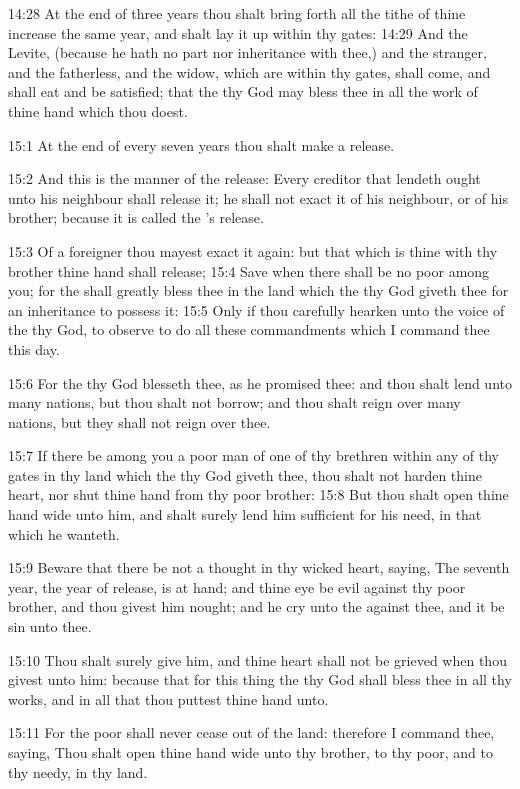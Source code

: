 14:28 At the end of three years thou shalt bring forth all the tithe of thine increase the same year, and shalt lay it up within thy gates: 14:29 And the Levite, (because he hath no part nor inheritance with thee,) and the stranger, and the fatherless, and the widow, which are within thy gates, shall come, and shall eat and be satisfied; that the \LORD thy God may bless thee in all the work of thine hand which thou doest.

15:1 At the end of every seven years thou shalt make a release.

15:2 And this is the manner of the release: Every creditor that lendeth ought unto his neighbour shall release it; he shall not exact it of his neighbour, or of his brother; because it is called the \LORD's release.

15:3 Of a foreigner thou mayest exact it again: but that which is thine with thy brother thine hand shall release; 15:4 Save when there shall be no poor among you; for the \LORD shall greatly bless thee in the land which the \LORD thy God giveth thee for an inheritance to possess it: 15:5 Only if thou carefully hearken unto the voice of the \LORD thy God, to observe to do all these commandments which I command thee this day.

15:6 For the \LORD thy God blesseth thee, as he promised thee: and thou shalt lend unto many nations, but thou shalt not borrow; and thou shalt reign over many nations, but they shall not reign over thee.

15:7 If there be among you a poor man of one of thy brethren within any of thy gates in thy land which the \LORD thy God giveth thee, thou shalt not harden thine heart, nor shut thine hand from thy poor brother: 15:8 But thou shalt open thine hand wide unto him, and shalt surely lend him sufficient for his need, in that which he wanteth.

15:9 Beware that there be not a thought in thy wicked heart, saying, The seventh year, the year of release, is at hand; and thine eye be evil against thy poor brother, and thou givest him nought; and he cry unto the \LORD against thee, and it be sin unto thee.

15:10 Thou shalt surely give him, and thine heart shall not be grieved when thou givest unto him: because that for this thing the \LORD thy God shall bless thee in all thy works, and in all that thou puttest thine hand unto.

15:11 For the poor shall never cease out of the land: therefore I command thee, saying, Thou shalt open thine hand wide unto thy brother, to thy poor, and to thy needy, in thy land.

